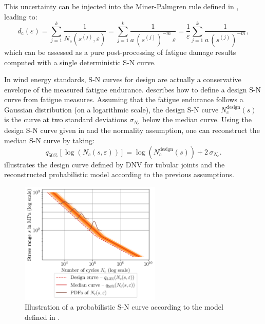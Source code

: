 This uncertainty can be injected into the Miner-Palmgren rule defined in , leading to: 
\begin{equation}
    d_{\mathrm{c}}(\varepsilon) = \sum_{j=1}^k \frac{1}{N_c(s^{(j)}, \varepsilon)}
            = \sum_{j=1}^k \frac{1}{a \, \left(s^{(j)}\right)^{-m} \, \varepsilon}
            = \frac{1}{\varepsilon} \sum_{j=1}^k \frac{1}{a \, \left(s^{(j)}\right)^{-m}},
\end{equation}
which can be assessed as a pure post-processing of fatigue damage results computed with a single deterministic S-N curve. 

In wind energy standards, S-N curves for design are actually a conservative envelope of the measured fatigue endurance. 
\citet[Appendix F.7]{dnv_fatigue_2016} describes how to define a design S-N curve from fatigue measures. 
Assuming that the fatigue endurance follows a Gaussian distribution (on a logarithmic scale), the design S-N curve $N_c^{\mathrm{design}}(s)$ is the curve at two standard deviations $\sigma_{N_c}$ below the median curve. 
Using the design S-N curve given in \citet[Sec. 2.4.6]{dnv_fatigue_2016} and the normality assumption, one can reconstruct the median S-N curve by taking: 
\begin{equation}
    q_{50\%}[\log(N_c(s, \varepsilon))]= \log(N_c^{\mathrm{design}}(s)) + 2 \, \sigma_{N_c}. 
\end{equation}
 illustrates the design curve defined by DNV for tubular joints \citet[Sec. 2.4.6]{dnv_fatigue_2016} and the reconstructed probabilistic model according to the previous assumptions. 

\begin{figure}
    \centering
    \includegraphics[width=0.6\textwidth]{../numerical_experiments/chapter2/figures/probabilistic_fatigue.png}
    \caption{Illustration of a probabilistic S-N curve according to the model defined in \citet{guede_2007}.}
    \label{fig:probabilistic_SN}
\end{figure}


